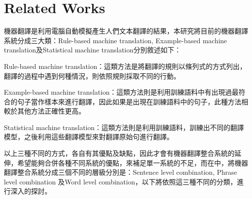 \chapter{Related Works}
\label{ch:relatedworks}

機器翻譯是利用電腦自動模擬產生人們文本翻譯的結果，本研究將目前的機器翻譯系統分成三大類：Rule-based machine translation, Example-based machine translation及Statistical machine translation分別敘述如下：


Rule-based machine translation：這類方法是將翻譯的規則以條列式的方式列出，翻譯的過程中遇到何種情況，則依照規則採取不同的行動。


Example-based machine translation：這類方法則是利用訓練語料中有出現過最符合的句子當作樣本來進行翻譯，因此如果是出現在訓練語料中的句子，此種方法相較於其他方法正確性更高。


Statistical machine translation：這類方法則是利用訓練語料，訓練出不同的翻譯模型，之後利用這些翻譯模型來對翻譯原始句進行翻譯。


以上三種不同的方式，各自有其優點及缺點，因此才會有機器翻譯整合系統的延伸，希望能夠合併各種不同系統的優點，來補足單一系統的不足，而在\cite{ayan2008iab}中，將機器翻譯整合系統分成三個不同的層級分別是：Sentence level combination, Phrase level combination 及Word level combination，以下將依照這三種不同的分類，進行深入的探討。

